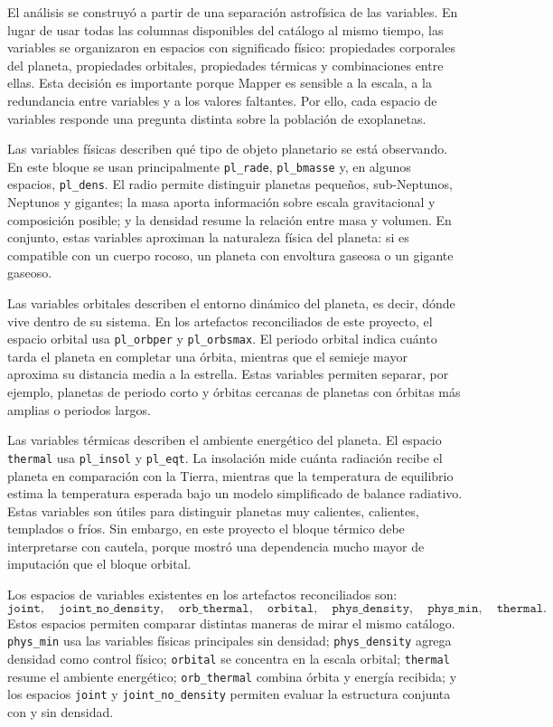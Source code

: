 El análisis se construyó a partir de una separación astrofísica de las variables. En lugar de usar todas las columnas disponibles del catálogo al mismo tiempo, las variables se organizaron en espacios con significado físico: propiedades corporales del planeta, propiedades orbitales, propiedades térmicas y combinaciones entre ellas. Esta decisión es importante porque Mapper es sensible a la escala, a la redundancia entre variables y a los valores faltantes. Por ello, cada espacio de variables responde una pregunta distinta sobre la población de exoplanetas.

Las variables físicas describen qué tipo de objeto planetario se está observando. En este bloque se usan principalmente \texttt{pl\_rade}, \texttt{pl\_bmasse} y, en algunos espacios, \texttt{pl\_dens}. El radio permite distinguir planetas pequeños, sub-Neptunos, Neptunos y gigantes; la masa aporta información sobre escala gravitacional y composición posible; y la densidad resume la relación entre masa y volumen. En conjunto, estas variables aproximan la naturaleza física del planeta: si es compatible con un cuerpo rocoso, un planeta con envoltura gaseosa o un gigante gaseoso.

Las variables orbitales describen el entorno dinámico del planeta, es decir, dónde vive dentro de su sistema. En los artefactos reconciliados de este proyecto, el espacio orbital usa \texttt{pl\_orbper} y \texttt{pl\_orbsmax}. El periodo orbital indica cuánto tarda el planeta en completar una órbita, mientras que el semieje mayor aproxima su distancia media a la estrella. Estas variables permiten separar, por ejemplo, planetas de periodo corto y órbitas cercanas de planetas con órbitas más amplias o periodos largos.

Las variables térmicas describen el ambiente energético del planeta. El espacio \texttt{thermal} usa \texttt{pl\_insol} y \texttt{pl\_eqt}. La insolación mide cuánta radiación recibe el planeta en comparación con la Tierra, mientras que la temperatura de equilibrio estima la temperatura esperada bajo un modelo simplificado de balance radiativo. Estas variables son útiles para distinguir planetas muy calientes, calientes, templados o fríos. Sin embargo, en este proyecto el bloque térmico debe interpretarse con cautela, porque mostró una dependencia mucho mayor de imputación que el bloque orbital.

Los espacios de variables existentes en los artefactos reconciliados son:
\[
\texttt{joint},\quad
\texttt{joint\_no\_density},\quad
\texttt{orb\_thermal},\quad
\texttt{orbital},\quad
\texttt{phys\_density},\quad
\texttt{phys\_min},\quad
\texttt{thermal}.
\]
Estos espacios permiten comparar distintas maneras de mirar el mismo catálogo. \texttt{phys\_min} usa las variables físicas principales sin densidad; \texttt{phys\_density} agrega densidad como control físico; \texttt{orbital} se concentra en la escala orbital; \texttt{thermal} resume el ambiente energético; \texttt{orb\_thermal} combina órbita y energía recibida; y los espacios \texttt{joint} y \texttt{joint\_no\_density} permiten evaluar la estructura conjunta con y sin densidad.

